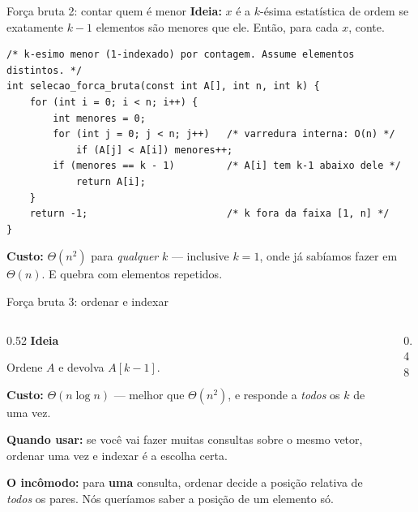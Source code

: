 \documentclass[aspectratio=169]{beamer}
\begin{document}
\begin{frame}[fragile]{Força bruta 2: contar quem é menor}
  \textbf{Ideia:} $x$ é a $k$-ésima estatística de ordem se exatamente $k-1$
  elementos são menores que ele. Então, para cada $x$, conte.

\begin{lstlisting}
/* k-esimo menor (1-indexado) por contagem. Assume elementos distintos. */
int selecao_forca_bruta(const int A[], int n, int k) {
    for (int i = 0; i < n; i++) {
        int menores = 0;
        for (int j = 0; j < n; j++)   /* varredura interna: O(n) */
            if (A[j] < A[i]) menores++;
        if (menores == k - 1)         /* A[i] tem k-1 abaixo dele */
            return A[i];
    }
    return -1;                        /* k fora da faixa [1, n] */
}
\end{lstlisting}

  \textbf{Custo:} $\Theta(n^2)$ para \emph{qualquer} $k$ --- inclusive $k=1$,
  onde já sabíamos fazer em $\Theta(n)$. E quebra com elementos repetidos.
\end{frame}

\begin{frame}{Força bruta 3: ordenar e indexar}
  \begin{columns}[T]
    \begin{column}{0.52\textwidth}
      \textbf{Ideia}

      Ordene $A$ e devolva $A[k-1]$.

      \medskip
      \textbf{Custo:} $\Theta(n \log n)$ --- melhor que $\Theta(n^2)$, e
      responde a \emph{todos} os $k$ de uma vez.

      \medskip
      \textbf{Quando usar:} se você vai fazer muitas consultas sobre o mesmo
      vetor, ordenar uma vez e indexar é a escolha certa.

      \medskip
      \textbf{O incômodo:} para \textbf{uma} consulta, ordenar decide a posição
      relativa de \emph{todos} os pares. Nós queríamos saber a posição de um
      elemento só.
    \end{column}
    \begin{column}{0.48\textwidth}
      \begin{center}
      \end{center}
    \end{column}
  \end{columns}
\end{frame}
\end{document}

